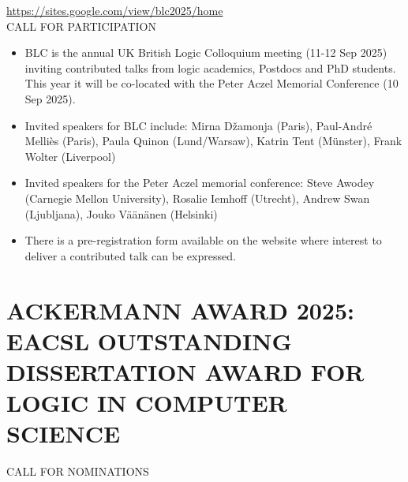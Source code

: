 \documentclass[prodmode,acmtecs]{acmsmall} %
\begin{document}
  \href{https://sites.google.com/view/blc2025/home}{https://sites.google.com/view/blc2025/home}\\ 
CALL FOR PARTICIPATION 

\begin{itemize}\item  BLC is the annual UK British Logic Colloquium meeting (11-12 Sep 2025) inviting contributed talks from logic academics, Postdocs and PhD students. This year it will be co-located with the Peter Aczel Memorial Conference (10 Sep 2025). 
 
\item  Invited speakers for BLC include: Mirna Džamonja (Paris), Paul-André Melliès (Paris), Paula Quinon (Lund/Warsaw), Katrin Tent (Münster), Frank Wolter (Liverpool)  
 
\item  Invited speakers for the Peter Aczel memorial conference: Steve Awodey (Carnegie Mellon University), Rosalie Iemhoff (Utrecht), Andrew Swan (Ljubljana), Jouko Väänänen (Helsinki)  
 
\item  There is a pre-registration form available on the website where interest to deliver a contributed talk can be expressed. 
 
\end{itemize}\section{ACKERMANN AWARD 2025: EACSL OUTSTANDING DISSERTATION AWARD FOR LOGIC IN COMPUTER SCIENCE}\label{ACKERMANNAWARD2025}CALL FOR NOMINATIONS 
\end{document}
